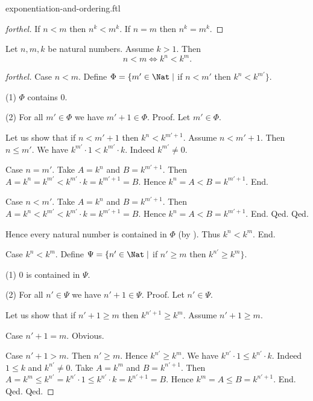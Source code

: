 \documentclass{naproche-library}
\begin{document}
\begin{smodule}[title=Exponentiation and Ordering]{exponentiation-and-ordering.ftl}
\begin{proof}[forthel]
  If $n < m$ then $n^{k} < m^{k}$.
  If $n = m$ then $n^{k} = m^{k}$.
\end{proof}

\begin{proposition}[forthel,id=ARITHMETIC_09_3349764703780864]
  Let $n, m, k$ be natural numbers.
  Assume $k > 1$.
  Then \[ n < m \iff k^{n} < k^{m}. \]
\end{proposition}
\begin{proof}[forthel]
  Case $n < m$.
    Define $\Phi = \{ m' \in \Nat \mid$ if $n < m'$ then $k^{n} < k^{m'} \}$.

    (1) $\Phi$ contains $0$.

    (2) For all $m' \in \Phi$ we have $m' + 1 \in \Phi$. \newline
    Proof.
      Let $m' \in \Phi$.

      Let us show that if $n < m' + 1$ then $k^{n} < k^{m' + 1}$.
        Assume $n < m' + 1$.
        Then $n \leq m'$.
        We have $k^{m'} \cdot 1 < k^{m'} \cdot k$.
        Indeed $k^{m'} \neq 0$.

        Case $n = m'$.
          Take $A = k^{n}$ and $B = k^{m' + 1}$. %
          Then $A
            = k^{n}
            = k^{m'}
            < k^{m'} \cdot k
            = k^{m' + 1}
            = B$.
          Hence $k^{n} = A < B = k^{m' + 1}$.
        End.

        Case $n < m'$.
          Take $A = k^{n}$ and $B = k^{m' + 1}$. %
          Then $A
            = k^{n}
            < k^{m'}
            < k^{m'} \cdot k
            = k^{m' + 1}
            = B$.
          Hence $k^{n} = A < B = k^{m' + 1}$.
        End.
      Qed.
    Qed.

    Hence every natural number is contained in $\Phi$ (by ).
    Thus $k^{n} < k^{m}$.
  End.

  Case $k^{n} < k^{m}$.
    Define $\Psi = \{ n' \in \Nat \mid$ if $n' \geq m$ then
    $k^{n'} \geq k^{m} \}$.

    (1) $0$ is contained in $\Psi$.

    (2) For all $n' \in \Psi$ we have $n' + 1 \in \Psi$. \newline
    Proof.
      Let $n' \in \Psi$.

      Let us show that if $n' + 1 \geq m$ then $k^{n' + 1} \geq k^{m}$.
        Assume $n' + 1 \geq m$.

        Case $n' + 1 = m$. Obvious.

        Case $n' + 1 > m$.
          Then $n' \geq m$.
          Hence $k^{n'} \geq k^{m}$.
          We have $k^{n'} \cdot 1 \leq k^{n'} \cdot k$.
          Indeed $1 \leq k$ and $k^{n'} \neq 0$.
          Take $A = k^{m}$ and $B = k^{n' + 1}$. %
          Then $A
            = k^{m}
            \leq k^{n'}
            = k^{n'} \cdot 1
            \leq k^{n'} \cdot k
            = k^{n' + 1}
            = B$.
          Hence $k^{m} = A \leq B = k^{n' + 1}$.
        End.
      Qed.
    Qed.


\end{proof}
\end{smodule}
\end{document}
